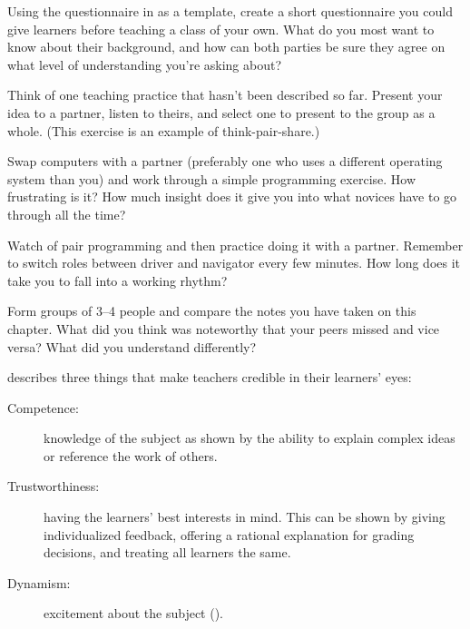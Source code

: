 

Using the questionnaire in  as a template,
create a short questionnaire you could give learners before teaching a class of your own.
What do you most want to know about their background,
and how can both parties be sure they agree on what level of understanding you're asking about?


Think of one teaching practice that hasn't been described so far.
Present your idea to a partner,
listen to theirs,
and select one to present to the group as a whole.
(This exercise is an example of think-pair-share.)


Swap computers with a partner
(preferably one who uses a different operating system than you)
and work through a simple programming exercise.
How frustrating is it?
How much insight does it give you into what novices have to go through all the time?


Watch  of pair programming
and then practice doing it with a partner.
Remember to switch roles between driver and navigator every few minutes.
How long does it take you to fall into a working rhythm?


Form groups of 3--4 people
and compare the notes you have taken on this chapter.
What did you think was noteworthy that your peers missed and vice versa?
What did you understand differently?


\cite{Fink2013} describes three things
that make teachers credible in their learners' eyes:

\begin{description}

\item[Competence:]
  knowledge of the subject
  as shown by the ability to explain complex ideas
  or reference the work of others.

\item[Trustworthiness:]
  having the learners' best interests in mind.
  This can be shown by giving individualized feedback,
  offering a rational explanation for grading decisions,
  and treating all learners the same.

\item[Dynamism:]
  excitement about the subject ().

\end{description}

